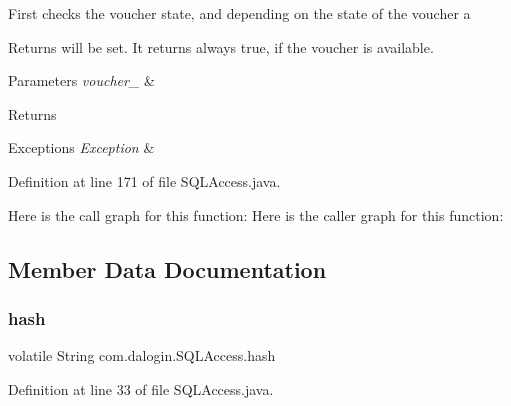 First checks the voucher state, and depending on the state of the voucher a \begin{DoxyReturn}{Returns}
will be set. It returns always true, if the voucher is available.
\end{DoxyReturn}

\begin{DoxyParams}{Parameters}
{\em voucher\+\_\+} & \\
\hline
\end{DoxyParams}
\begin{DoxyReturn}{Returns}

\end{DoxyReturn}

\begin{DoxyExceptions}{Exceptions}
{\em Exception} & \\
\hline
\end{DoxyExceptions}


Definition at line 171 of file S\+Q\+L\+Access.\+java.

Here is the call graph for this function\+:
Here is the caller graph for this function\+:


\subsection{Member Data Documentation}
\mbox{\label{classcom_1_1dalogin_1_1_s_q_l_access_ae23b949fc74966a8c7dd9e3a888b76c0}} 
\subsubsection{\texorpdfstring{hash}{hash}}
{\footnotesize\ttfamily volatile String com.\+dalogin.\+S\+Q\+L\+Access.\+hash\hspace{0.3cm}{\ttfamily [static]}}



Definition at line 33 of file S\+Q\+L\+Access.\+java.

\mbox{\label{classcom_1_1dalogin_1_1_s_q_l_access_ac34e9644bffccef034598dd30c5f6d80}} 
